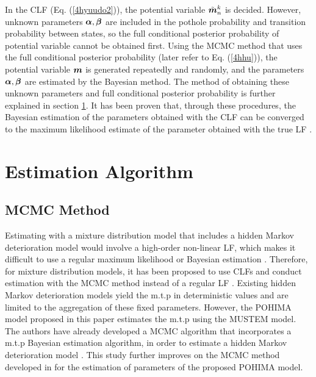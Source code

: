 \documentclass[Journal]{ascelike}
\begin{document}
In the CLF (Eq. (\ref{4hyuudo2})), the potential variable $\tilde{\mbox{\boldmath$m$}}_n^k$ is decided. However, unknown parameters $\mbox{\boldmath$\alpha$},\mbox{\boldmath$\beta$}$ are included in the pothole probability and transition probability between states, so the full conditional posterior probability of potential variable cannot be obtained first. Using the MCMC method that uses the full conditional posterior probability (later refer to Eq. (\ref{4hhu})), the potential variable $\mbox{\boldmath$m$}$ is generated repeatedly and randomly, and the parameters $\mbox{\boldmath$\alpha$},\mbox{\boldmath$\beta$}$ are estimated by the Bayesian method. The method of obtaining these unknown parameters and full conditional posterior probability is further explained in section \ref{Estimationalgorithm}. It has been proven that, through these procedures, the Bayesian estimation of the parameters obtained with the CLF can be converged to the maximum likelihood estimate of the parameter obtained with the true LF \citep{robe}.
\section{Estimation Algorithm}\label{Estimationalgorithm}
\subsection{MCMC Method} \label{subsec41}
Estimating with a mixture distribution model that includes a hidden Markov deterioration model would involve a high-order non-linear LF, which makes it difficult to use a regular maximum likelihood or Bayesian estimation \citep{robe}. Therefore, for mixture distribution models, it has been proposed to use CLFs and conduct estimation with the MCMC method instead of a regular LF \citep{robe}. Existing hidden Markov deterioration models yield the m.t.p in deterministic values and are limited to the aggregation of these fixed parameters. However, the POHIMA model proposed in this paper estimates the m.t.p using the MUSTEM model. The authors have already developed a MCMC algorithm that incorporates a m.t.p Bayesian estimation algorithm, in order to estimate a hidden Markov deterioration model \citep{Kobayashi2011}. This study further improves on the MCMC method developed in \cite{Kobayashi2011} for the estimation of parameters of the proposed POHIMA model.
\end{document}

